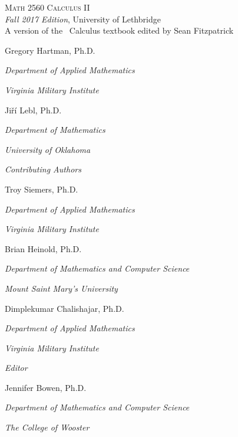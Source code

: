 
\hskip 125pt\begin{minipage}{\textwidth}
\begin{flushright}

\textsc{{\Huge Math 2560 Calculus II}} \\

\textsl{\large Fall 2017 Edition}, 
{\large University of Lethbridge}\\

{A version of the \apex\ Calculus textbook edited by Sean Fitzpatrick}

\bigskip

\Large

Gregory Hartman, Ph.D.

\emph{\small Department of Applied Mathematics}

\emph{\small Virginia Military Institute}\vskip15pt

Ji{\v r}\'i Lebl, Ph.D.

\emph{\small Department of Mathematics}

\emph{\small University of Oklahoma}

\parbox{200pt}{\textit{Contributing Authors}}\hskip 2cm \phantom{.}

Troy Siemers, Ph.D.

\emph{\small Department of Applied Mathematics}

\emph{\small Virginia Military Institute}\vskip 15pt

Brian Heinold, Ph.D.

\emph{\small Department of Mathematics and Computer Science}

\emph{\small Mount Saint Mary's University}\vskip 15pt

Dimplekumar Chalishajar, Ph.D.

\emph{\small Department of Applied Mathematics}

\emph{\small Virginia Military Institute}\vskip 25pt



\parbox{200pt}{\textit{Editor}}\hskip 2cm \phantom{.}

Jennifer Bowen, Ph.D.

\emph{\small Department of Mathematics and Computer Science}

\emph{\small The College of Wooster}


\normalsize
\end{flushright}
\end{minipage}

